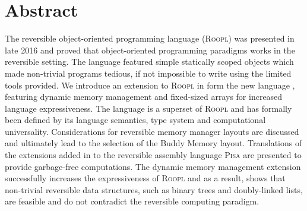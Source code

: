 \chapter*{Abstract}

The reversible object-oriented programming language (\textsc{Roopl}) was presented in late 2016 and proved that object-oriented programming paradigms works in the reversible setting. The language featured simple statically scoped objects which made non-trivial programs tedious, if not impossible to write using the limited tools provided.
We introduce an extension to \textsc{Roopl} in form the new language \rooplpp, featuring dynamic memory management and fixed-sized arrays for increased language expressiveness. The language is a superset of \textsc{Roopl} and has formally been defined by its language semantics, type system and computational universality. Considerations for reversible memory manager layouts are discussed and ultimately lead to the selection of the Buddy Memory layout. Translations of the extensions added in \rooplpp to the reversible assembly language \textsc{Pisa} are presented to provide garbage-free computations. The dynamic memory management extension successfully increases the expressiveness of \textsc{Roopl} and as a result, shows that non-trivial reversible data structures, such as binary trees and doubly-linked lists, are feasible and do not contradict the reversible computing paradigm.